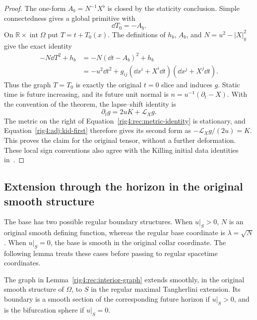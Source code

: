 \begin{proof}
The one-form $A_b=N^{-1}X^\flat$ is closed by the staticity conclusion.  Simple
connectedness gives a global primitive with
\begin{equation}
 \dd T_0=-A_b.
 \label{rig4:rec:primitive}
\end{equation}
On $\mathbb R\times\operatorname{int}\Omega$ put $T=t+T_0(x)$.  The definitions
of $h_b$, $A_b$, and $N=u^2-|X|_g^2$ give the exact identity
\begin{equation}
 \begin{split}
 -N\dd T^2+h_b
 &=-N(\dd t-A_b)^2+h_b\\
 &=-u^2\dd t^2+
   g_{ij}(\dd x^i+X^i\dd t)(\dd x^j+X^j\dd t).
 \end{split}
 \label{rig4:rec:metric-identity}
\end{equation}
Thus the graph $T=T_0$ is exactly the original $t=0$ slice and induces $g$.
Static time is future increasing, and its future unit normal is
$n=u^{-1}(\partial_t-X)$.  With the convention of the theorem, the
lapse--shift identity is
\[
 \partial_tg=2uK+\mathcal L_Xg.
\]
The metric on the right of Equation~\eqref{rig4:rec:metric-identity} is stationary,
and Equation~\eqref{rig4:adj:kid-first} therefore gives its second form as
$-\mathcal L_Xg/(2u)=K$.  This proves the claim for the original tensor,
without a further deformation.  These local sign conventions also agree
with the Killing initial data identities
in~\cite[Equations~(2.6) and~(2.14)]{BeigChrusciel1997KID}.
\end{proof}

\subsection{Extension through the horizon in the original smooth structure}

The base has two possible regular boundary structures.  When $u|_S>0$,
$N$ is an original smooth defining function, whereas the regular base
coordinate is $\lambda=\sqrt N$.  When $u|_S=0$, the base is smooth in the
original collar coordinate.  The following lemma treats these cases before
passing to regular spacetime coordinates.

\begin{lemma}
\label{rig4:rec:horizon-extension}
The graph in Lemma~\ref{rig4:rec:interior-graph} extends smoothly, in the original
smooth structure of $\Omega$, to $S$ in the regular maximal Tangherlini
extension.  Its boundary is a smooth section of the corresponding future
horizon if $u|_S>0$, and is the bifurcation sphere if $u|_S=0$.
\end{lemma}

